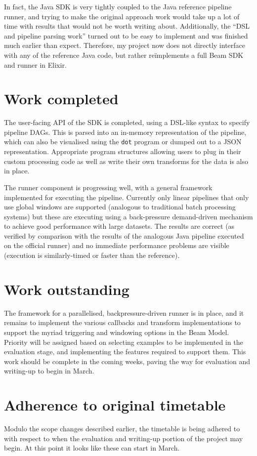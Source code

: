 \documentclass[11pt]{scrartcl}
\begin{document}
In fact, the Java SDK is very tightly coupled to the Java reference pipeline runner, and trying to make the 
original approach work would take up a lot of time with results that would not be worth writing about. Additionally, the ``DSL and pipeline parsing work'' turned out to be easy to implement and was finished much earlier than expect. Therefore, my project now does not directly interface with any of the reference Java code, but rather re\"implements a full Beam SDK and runner in Elixir.

\section*{Work completed}
The user-facing API of the SDK is completed, using a DSL-like syntax to specify pipeline DAGs. This is parsed into an in-memory representation of the pipeline, which can also be visualised using the \texttt{dot} program or dumped out to a JSON representation. Appropriate program structures allowing users to plug in their custom processing code as well as write their own transforms for the data is also in place.

The runner component is progressing well, with a general framework implemented for executing the pipeline. Currently only linear pipelines that only use global windows are supported (analogous to traditional batch processing systems) but these are executing using a back-pressure demand-driven mechanism to achieve good performance with large datasets. The results are correct (as verified by comparison with the results of the analogous Java pipeline executed on the official runner) and no immediate performance problems are visible (execution is similarly-timed or faster than the reference).

\section*{Work outstanding}
The framework for a parallelised, backpressure-driven runner is in place, and it remains to implement the various callbacks and transform implementations to support the myriad triggering and windowing options in the Beam Model. Priority will be assigned based on selecting examples to be implemented in the evaluation stage, and implementing the features required to support them. This work should be complete in the coming weeks, paving the way for evaluation and writing-up to begin in March.

\section*{Adherence to original timetable}
Modulo the scope changes described earlier, the timetable is being adhered to with respect to when the evaluation and writing-up portion of the project may begin. At this point it looks like these can start in March.
\end{document}

